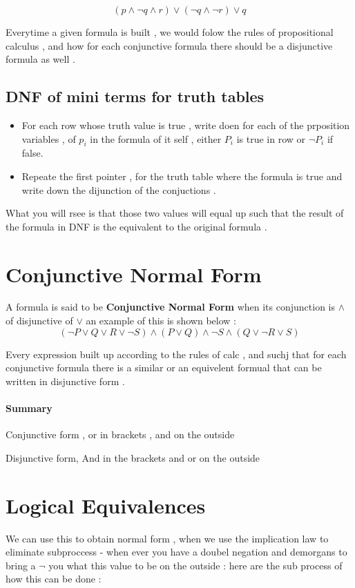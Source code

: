 \documentclass{article}
\theoremstyle{mytheoremstyle}
\theoremstyle{mytheoremstyle}
\theoremstyle{myproblemstyle}
\begin{document}
\[(p \land \neg q \land r) \lor (\neg q \land \neg r) \lor q \]

Everytime a given formula is built , we would folow the rules of propositional calculus , and how for each conjunctive formula there should be a disjunctive formula as well .

\subsection{DNF of mini terms for truth tables}
\begin{itemize}
	\item For each row whose truth value is true , write doen for each of the prposition variables , of $ p_i $ in the formula of it self , either $P_i$ is true in row or $\neg P_i$ if false.
	\item Repeate the first pointer , for the truth table where the formula is true and write down the dijunction of the conjuctions .
\end{itemize}

What you will rsee is that those two values will equal up such that the result of the formula in DNF is the equivalent to the original formula .

\section{Conjunctive Normal Form}
A formula is said to be \textbf{Conjunctive Normal Form} when its conjunction is $ \land $ of disjunctive of $ \lor $ an example of this is shown below :
\[(\neg P \lor Q \lor R \lor \neg S) \land (P \lor Q) \land \neg S \land (Q \lor \neg R \lor S)\]

Every expression built up according to the rules of calc , and suchj that for each conjunctive formula there is a similar or an equivelent formual that can be written in disjunctive form .

\paragraph{Summary}
\item Conjunctive form , or in brackets , and on the outside
\item Disjunctive form,  And in the brackets and or on the outside
\newpage
\section{Logical Equivalences}
We can use this to obtain normal form , when we use the implication law to eliminate subproccess - when ever you have a doubel negation and demorgans to bring a $ \neg $ you what this value to be on the outside  : here are the sub process of how this can be done :
\end{document}
